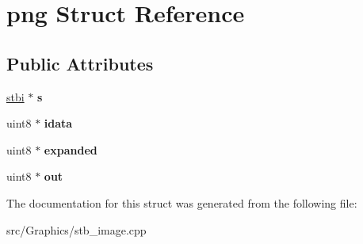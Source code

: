 \hypertarget{structpng}{\section{png Struct Reference}
\label{structpng}
}
\subsection*{Public Attributes}
\begin{DoxyCompactItemize}
\item 
\hypertarget{structpng_a77d3bfd0ae8f598a475317ed39e78fd0}{\hyperlink{structstbi}{stbi} $\ast$ {\bfseries s}}\label{structpng_a77d3bfd0ae8f598a475317ed39e78fd0}

\item 
\hypertarget{structpng_a5cd944fdf0f0417a344bcc538ed98ed6}{uint8 $\ast$ {\bfseries idata}}\label{structpng_a5cd944fdf0f0417a344bcc538ed98ed6}

\item 
\hypertarget{structpng_a474dd0da8ac0347924e68f5de7e68c55}{uint8 $\ast$ {\bfseries expanded}}\label{structpng_a474dd0da8ac0347924e68f5de7e68c55}

\item 
\hypertarget{structpng_ada33c39620ad9a647c088c40d21887f6}{uint8 $\ast$ {\bfseries out}}\label{structpng_ada33c39620ad9a647c088c40d21887f6}

\end{DoxyCompactItemize}


The documentation for this struct was generated from the following file\+:\begin{DoxyCompactItemize}
\item 
src/\+Graphics/stb\+\_\+image.\+cpp\end{DoxyCompactItemize}

